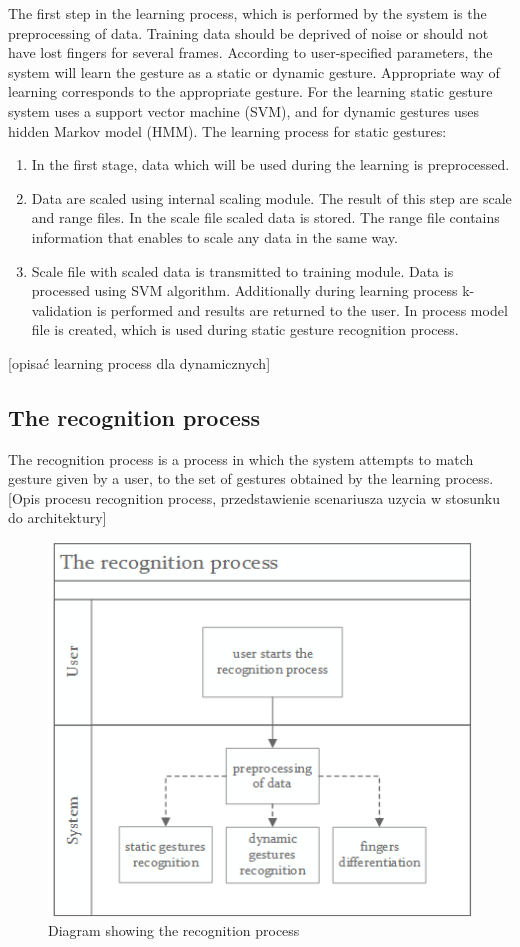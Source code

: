 The first step in the learning process, which is performed by the system is the preprocessing of data. Training data should be deprived of noise or should not have lost fingers for several frames. According to user-specified parameters, the system will learn the gesture as a static or dynamic gesture. Appropriate way of learning corresponds to the appropriate gesture.
For the learning static gesture system uses a support vector machine (SVM), and for dynamic gestures uses hidden Markov model (HMM). 
The learning process for static gestures:
\begin{enumerate}
\item In the first stage, data which will be used during the learning is preprocessed.
\item Data are scaled using internal scaling module. The result of this step are scale and range files. In the scale file scaled data is stored. The range file contains information that enables to scale any data in the same way.
\item Scale file with scaled data is transmitted to training module. Data is processed using SVM algorithm. Additionally during learning process k-validation is performed and results are returned to the user. In process model file is created, which is used during static gesture recognition process.
\end{enumerate}
{\color{red}[opisać learning process dla dynamicznych]}


\subsection{The recognition process}
The recognition process is a process in which the system attempts to match gesture given by a user, to the set of gestures obtained by the learning process. {\color{red}[Opis procesu recognition process, przedstawienie scenariusza uzycia w stosunku do architektury]}

\begin{figure}[htb]
\centering
 \includegraphics[width=0.6\columnwidth]{figures/recognitionProcess.png}
 \caption{Diagram showing the recognition process}
 \label{recognitionprocess}
\end{figure}

